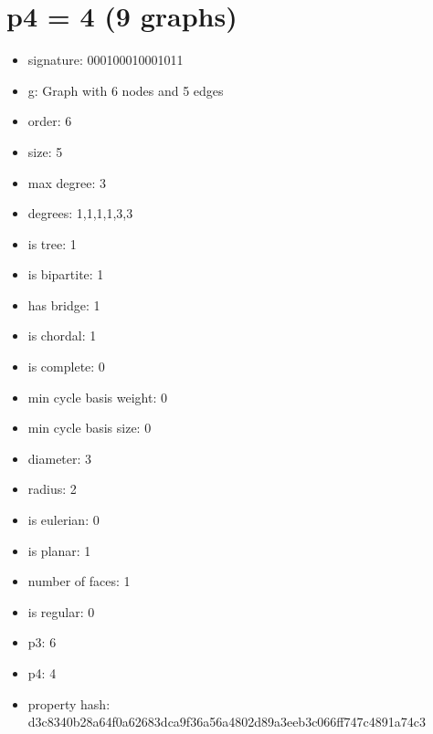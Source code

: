 \chapter{p4 = 4 (9 graphs)}
\newpage\begin{figure}
\end{figure}
\begin{itemize}
\item signature: 000100010001011
\item g: Graph with 6 nodes and 5 edges
\item order: 6
\item size: 5
\item max degree: 3
\item degrees: 1,1,1,1,3,3
\item is tree: 1
\item is bipartite: 1
\item has bridge: 1
\item is chordal: 1
\item is complete: 0
\item min cycle basis weight: 0
\item min cycle basis size: 0
\item diameter: 3
\item radius: 2
\item is eulerian: 0
\item is planar: 1
\item number of faces: 1
\item is regular: 0
\item p3: 6
\item p4: 4
\item property hash: d3c8340b28a64f0a62683dca9f36a56a4802d89a3eeb3c066ff747c4891a74c3
\end{itemize}
\newpage
\begin{figure}
\end{figure}
